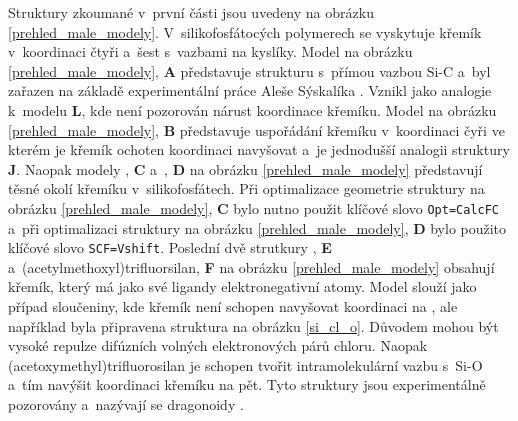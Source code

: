 \documentclass[
digital, %
table,   %
nolof,     %
nolot,     %
oneside,
]{fithesis3}
\begin{document}
Struktury zkoumané v~první části jsou uvedeny na obrázku \ref{prehled_male_modely}. V~silikofosfátocých polymerech se vyskytuje křemík v~koordinaci čtyři a~šest s~vazbami na kyslíky. Model  na obrázku \ref{prehled_male_modely}, \textbf{A} představuje strukturu s~přímou vazbou Si-C a~byl zařazen na základě experimentální práce Aleše Sýskalíka \cite{Styskalik2015thesis}. Vznikl jako analogie k~modelu \textbf{L}, kde není pozorován nárust koordinace křemíku.  Model  na obrázku \ref{prehled_male_modely}, \textbf{B} představuje uspořádání křemíku v~koordinaci čyři ve kterém je křemík ochoten koordinaci navyšovat a~je jednodušší analogii struktury \textbf{J}. Naopak modely , \textbf{C} a~, \textbf{D} na obrázku \ref{prehled_male_modely} představují těsné okolí křemíku v~silikofosfátech. Při optimalizace geometrie struktury  na obrázku \ref{prehled_male_modely}, \textbf{C} bylo nutno použit klíčové slovo \texttt{Opt=CalcFC} a~při optimalizaci struktury   na obrázku \ref{prehled_male_modely}, \textbf{D} bylo použito klíčové slovo \texttt{SCF=Vshift}.
Poslední dvě strutkury  ,  \textbf{E} a~(acetylmethoxyl)trifluorsilan, \textbf{F} na obrázku \ref{prehled_male_modely} obsahují křemík, který má jako své ligandy elektronegativní atomy. Model  slouží jako případ sloučeniny, kde křemík není schopen navyšovat koordinaci na , ale například byla připravena struktura na obrázku \ref{si_cl_o}. Důvodem mohou být vysoké repulze difúzních volných elektronových párů chloru. Naopak (acetoxymethyl)trifluorosilan je schopen tvořit intramolekulární vazbu s~Si-O a~tím navýšit koordinaci křemíku na pět. Tyto  struktury jsou experimentálně pozorovány a~nazývají se dragonoidy \cite{Chipanina2011}.\\
\end{document}
